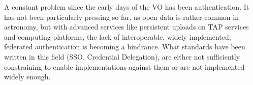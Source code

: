 A constant problem since the early days of the VO has been
authentication.  It has not been particularly pressing so far, as open
data is rather common in astronomy, but with advanced services like
persistent uploads on TAP services and computing platforms,
the lack of interoperable, widely implemented, federated authentication
is becoming a hindrance.  What standards have been written in this field
(SSO, Credential Delegation), are either not sufficiently constraining
to enable implementations against them or are not implemented widely
enough.
